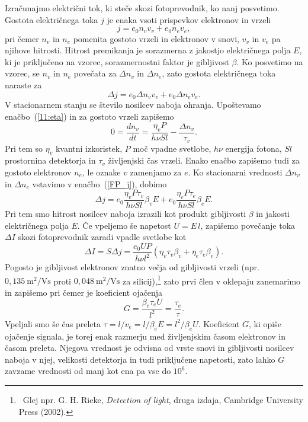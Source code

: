 Izračunajmo električni tok, ki steče skozi fotoprevodnik, ko nanj posvetimo. 
Gostota električnega toka $j$ je enaka vsoti prispevkov elektronov  in 
vrzeli
\begin{equation}
j = e_0 n_v v_v + e_0 n_e v_e,
\end{equation}
pri čemer $n_v$ in $n_e$ pomenita gostoto vrzeli in elektronov v snovi, $v_v$ in $v_e$ pa 
njihove hitrosti. Hitrost premikanja 
je sorazmerna z jakostjo električnega polja $E$, ki je priključeno
 na vzorec, sorazmernostni faktor je gibljivost $\beta$. Ko posvetimo na vzorec, 
 se $n_v$ in $n_e$ povečata za $\Delta n_v$ in $\Delta n_e$, zato
gostota električnega toka naraste za
\begin{equation}
\Delta j = e_0 \Delta n_v v_v + e_0 \Delta n_e v_e.
\label{FP_j}
\end{equation}
V stacionarnem stanju se število nosilcev naboja ohranja. Upoštevamo enačbo~(\ref{11:eta})
in za gostoto vrzeli zapišemo
\begin{equation}
0 = \frac{dn_v}{dt} = \frac{\eta_v P}{h \nu Sl} - \frac{\Delta n_v}{\tau_v}.
\end{equation}
Pri tem so $\eta_v$ kvantni izkoristek, $P$ moč vpadne svetlobe, $h\nu$ energija fotona,
$Sl$ prostornina detektorja in $\tau_v$ življenjski čas vrzeli. Enako enačbo 
zapišemo tudi za gostoto elektronov $n_e$, le oznake $v$ zamenjamo za $e$. 
Ko stacionarni vrednosti $\Delta n_v$ in $\Delta n_e$ vstavimo v enačbo~(\ref{FP_j}), dobimo
\begin{equation}
\Delta j = e_0 \frac{\eta_v P \tau_v}{h \nu Sl} \beta_v  E + 
e_0 \frac{\eta_e P \tau_e}{h \nu Sl} \beta_e  E.
\end{equation}
Pri tem smo hitrost nosilcev naboja izrazili kot produkt gibljivosti $\beta$ in jakosti
električnega polja $E$. Če vpeljemo še napetost $U = E\,l$, zapišemo povečanje toka $\Delta I$
skozi fotoprevodnik zaradi vpadle svetlobe kot
\begin{equation}
\Delta I = S\Delta j = \frac{e_0 U P }{h \nu l^2} \left(\eta_v \tau_v \beta_v + 
\eta_e \tau_e \beta_e \right)\!.
\end{equation}
Pogosto je gibljivost elektronov znatno večja od gibljivosti vrzeli (npr.
$0,135~\si{\meter}^2/\si{\volt\second}$ proti $0,048~\si{\meter}^2/\si{\volt\second}$ za
silicij),\footnote{~Glej npr. G. H. Rieke, {\it Detection 
of light}, druga izdaja, Cambridge University Press (2002).} 
 zato prvi člen v oklepaju zanemarimo in zapišemo
pri čemer je koeficient ojačenja 
\begin{equation}
G = \frac{\beta_e \tau_e U}{l^2} = \frac{\tau_e}{\tau}.
\end{equation}
Vpeljali smo še čas preleta $\tau = l/v_e = l/\beta_e E = l^2/\beta_e U$.
\newpage
Koeficient $G$, ki opiše ojačenje signala, je torej enak razmerju med 
življenjskim časom elektronov in časom preleta. 
Njegova vrednost je odvisna od 
vrste snovi in gibljivosti nosilcev naboja v njej, velikosti
detektorja in tudi priključene napetosti, zato lahko $G$ zavzame vrednosti od manj kot ena pa
vse do $10^6$. 

